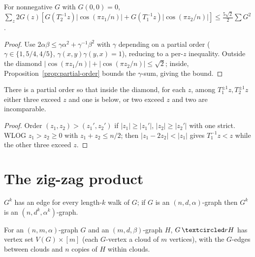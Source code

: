 \begin{theorem}
  \label{thm:margulis-nonneg}
  For nonnegative $G$ with $G(0,0)=0$,
  $\sum_z2G(z)[G(T_2^{-1}z)|\cos(\pi z_1/n)|+G(T_1^{-1}z)|\cos(\pi
  z_2/n)|]\le\tfrac{5\sqrt2}2\sum G^2$.
\end{theorem}
\begin{proof}
  Use $2\alpha\beta\le\gamma\alpha^2+\gamma^{-1}\beta^2$ with $\gamma$ depending
  on a partial order ($\gamma\in\{1,5/4,4/5\}$, $\gamma(x,y)\gamma(y,x)=1$),
  reducing to a per-$z$ inequality. Outside the diamond $|\cos(\pi z_1/n)|+|\cos(
  \pi z_2/n)|\le\sqrt2$; inside, Proposition~\ref{prop:partial-order} bounds the
  $\gamma$-sum, giving the bound.
\end{proof}

\begin{proposition}
  \label{prop:partial-order}
  There is a partial order so that inside the diamond, for each $z$, among
  $T_1^{\pm1}z,T_2^{\pm1}z$ either three exceed $z$ and one is below, or two
  exceed $z$ and two are incomparable.
\end{proposition}
\begin{proof}
  Order $(z_1,z_2)>(z_1',z_2')$ if $|z_1|\ge|z_1'|$, $|z_2|\ge|z_2'|$ with one
  strict. WLOG $z_1>z_2\ge0$ with $z_1+z_2\le n/2$; then $|z_1-2z_2|<|z_1|$ gives
  $T_1^{-1}z<z$ while the other three exceed $z$.
\end{proof}


\chapter{The zig-zag product}

\begin{definition}
  \label{def:graph-power}
  $G^k$ has an edge for every length-$k$ walk of $G$; if $G$ is an
  $(n,d,\alpha)$-graph then $G^k$ is an $(n,d^k,\alpha^k)$-graph.
\end{definition}

\begin{definition}
  \label{def:replacement-product}
  For an $(n,m,\alpha)$-graph $G$ and an $(m,d,\beta)$-graph $H$, $G\,\textcircled
  rH$ has vertex set $V(G)\times[m]$ (each $G$-vertex a cloud of $m$ vertices),
  with the $G$-edges between clouds and $n$ copies of $H$ within clouds.
\end{definition}

